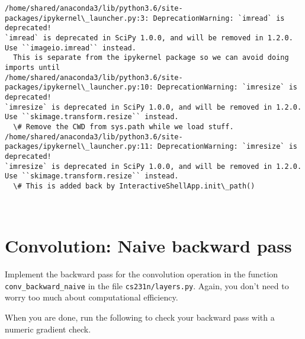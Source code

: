 \documentclass[11pt]{article}
\begin{document}
    \begin{Verbatim}[commandchars=\\\{\}]
/home/shared/anaconda3/lib/python3.6/site-packages/ipykernel\_launcher.py:3: DeprecationWarning: `imread` is deprecated!
`imread` is deprecated in SciPy 1.0.0, and will be removed in 1.2.0.
Use ``imageio.imread`` instead.
  This is separate from the ipykernel package so we can avoid doing imports until
/home/shared/anaconda3/lib/python3.6/site-packages/ipykernel\_launcher.py:10: DeprecationWarning: `imresize` is deprecated!
`imresize` is deprecated in SciPy 1.0.0, and will be removed in 1.2.0.
Use ``skimage.transform.resize`` instead.
  \# Remove the CWD from sys.path while we load stuff.
/home/shared/anaconda3/lib/python3.6/site-packages/ipykernel\_launcher.py:11: DeprecationWarning: `imresize` is deprecated!
`imresize` is deprecated in SciPy 1.0.0, and will be removed in 1.2.0.
Use ``skimage.transform.resize`` instead.
  \# This is added back by InteractiveShellApp.init\_path()

    \end{Verbatim}

    \begin{center}
    \end{center}
    { \hspace*{\fill} \\}
    
    \section{Convolution: Naive backward
pass}\label{convolution-naive-backward-pass}

Implement the backward pass for the convolution operation in the
function \texttt{conv\_backward\_naive} in the file
\texttt{cs231n/layers.py}. Again, you don't need to worry too much about
computational efficiency.

When you are done, run the following to check your backward pass with a
numeric gradient check.
\end{document}

